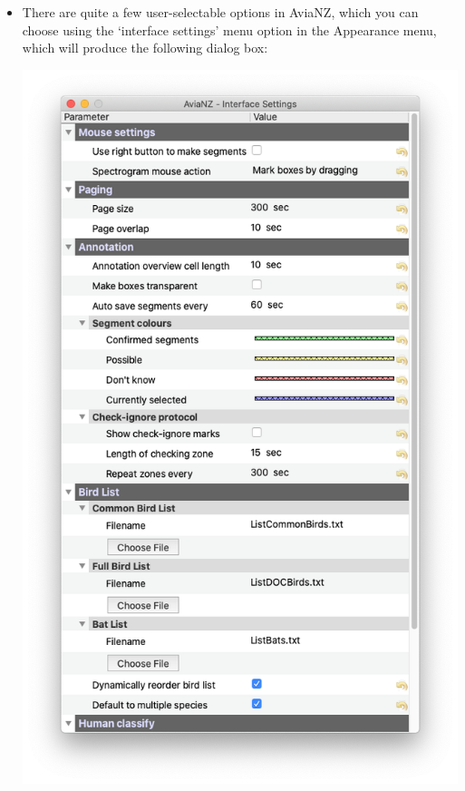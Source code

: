\documentclass{article}
\begin{document}
\begin{itemize}
\item There are quite a few user-selectable options in AviaNZ, which you can choose using the `interface settings' menu option in the Appearance menu, which will produce the following dialog box:
\begin{center}
    \includegraphics[width=.65\textwidth]{Figures/InterfaceSettings}
\end{center}


\end{itemize}
\end{document}
